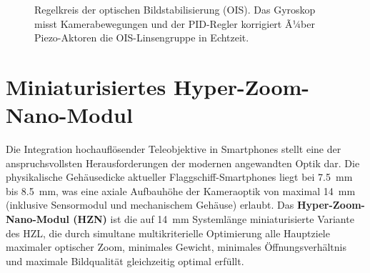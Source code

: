 ﻿\documentclass[12pt,a4paper]{article}
\theoremstyle{definition}
\begin{document}
	\begin{figure}[H]
		\centering
		\caption{Regelkreis der optischen Bildstabilisierung (OIS). Das Gyroskop
			misst Kamerabewegungen und der PID-Regler korrigiert Ã¼ber Piezo-Aktoren
			die OIS-Linsengruppe in Echtzeit.}
		\label{fig:ois}
	\end{figure}
	
	\section{Miniaturisiertes Hyper-Zoom-Nano-Modul}

	Die Integration hochaufl\"osender Teleobjektive in Smartphones stellt eine
	der anspruchsvollsten Herausforderungen der modernen angewandten Optik dar.
	Die physikalische Geh\"ausedicke aktueller Flaggschiff-Smartphones liegt bei
	\SI{7.5}{\milli\metre} bis \SI{8.5}{\milli\metre}, was eine axiale Aufbauh\"ohe
	der Kameraoptik von maximal \SI{14}{\milli\metre} (inklusive Sensormodul und
	mechanischem Geh\"ause) erlaubt. Das \textbf{Hyper-Zoom-Nano-Modul (HZN)} ist
	die auf \SI{14}{\milli\metre} Systeml\"ange miniaturisierte Variante des HZL,
	die durch simultane multikriterielle Optimierung alle Hauptziele \textemdash
	maximaler optischer Zoom, minimales Gewicht, minimales \"Offnungsverh\"altnis
	und maximale Bildqualit\"at \textemdash gleich\-zeitig optimal erf\"ullt.
\end{document}
